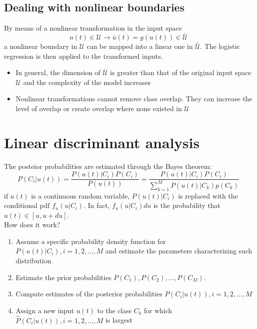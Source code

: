 \documentclass{book}
\theoremstyle{definition}
\theoremstyle{remark}
\theoremstyle{remark}
\begin{document}
\subsection{Dealing with nonlinear boundaries}
By means of a nonlinear transformation in the input space
\[
    u(t)\in\mathcal{U}\rightarrow \bar{u}(t)=g(u(t))\in\bar{\mathcal{U}}
\]
a nonlinear boundary in $\mathcal{U}$ can be mapped into a linear one in $\bar{\mathcal{U}}$. The logistic regression is then applied to the transformed inputs. 
\begin{itemize}
    \item In general, the dimension of $\bar{\mathcal{U}}$ is greater than that of the original input space $\mathcal{U}$ and the complexity of the model increases 
    \item Nonlinear transformations cannot remove class overlap. They can increase the level of overlap or create overlap where none existed in $\mathcal{U}$
\end{itemize}

\section{Linear discriminant analysis}
The posteior probabilities are estimated through the Bayes theorem:
\[
    P(C_i|u(t)) =\displaystyle\frac{P(u(t)|C_i)P(C_i)}{P(u(t))}=\displaystyle\frac{P(u(t)|C_i)P(C_i)}{\sum_{k=1}^{M}P(u(t)|C_k)p(C_k)}
\]
if $u(t)$ is a continuous random variable, $P(u(t)|C_i)$ is replaced with the conditional pdf $f_u(u|C_i)$. In fact, $f_u(u|C_i)du$ is the probability that $u(t)\in[u,u+du]$.
\\How does it work? 
\begin{enumerate}
    \item Assume a specific probability density function for $P(u(t)|C_i),i=1,2,\dots,M$ and estimate the parameters characterizing such distribution 
    \item Estimate the prior probabilities $P(C_1),P(C_2),\dots,P(C_M)$. 
    \item Compute estimates of the posterior probabilities $P(C_i|u(t)),i=1,2,\dots,M$ 
    \item Assign a new input $u(t)$ to the class $C_k$ for which $\hat{P}(C_i|u(t)),i=1,2,\dots, M$ is largest
\end{enumerate}
\end{document}
